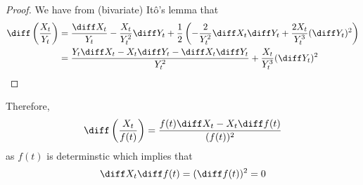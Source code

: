 \begin{subproblem}[(\alph*)]
        \item
        \begin{proof}
            We have from (bivariate) It\^o's lemma that
            \[\begin{aligned}
                \diff\left(\frac{X_t}{Y_t}\right)&=
                \frac{\diff X_t}{Y_t}-\frac{X_t}{Y_t^2}\diff Y_t
                +\frac{1}{2}\left(
                    -\frac{2}{Y_t^2}\diff X_t\diff Y_t
                    +\frac{2X_t}{Y_t^3}(\diff Y_t)^2
                \right)\\
                &=\frac{Y_t\diff X_t-X_t\diff Y_t-\diff X_t\diff Y_t}%
                  {Y_t^2}+\frac{X_t}{Y_t^3}(\diff Y_t)^2
            \end{aligned}\]
        \end{proof}

        Therefore,
        \[\diff\left(\frac{X_t}{f(t)}\right)
        =\frac{f(t)\diff X_t-X_t\diff f(t)}{(f(t))^2}\]
        as $f(t)$ is determinstic which implies that
        \[\diff X_t\diff f(t)=(\diff f(t))^2=0\]
    \end{subproblem}

